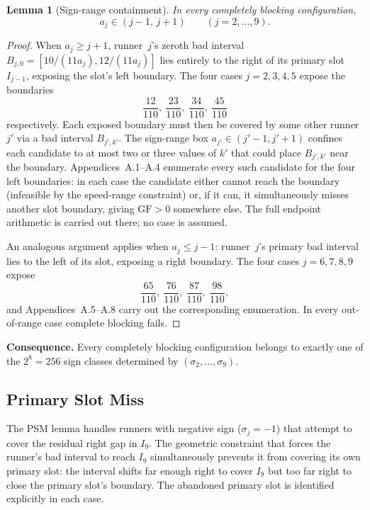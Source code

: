 \documentclass[12pt,a4paper]{amsart}
\newtheorem{lemma}[theorem]{Lemma}
\theoremstyle{definition}
\theoremstyle{remark}
\newcommand{\GF}{\mathrm{GF}}
\begin{document}
\begin{lemma}[Sign-range containment]\label{lem:sign-range}
In every completely blocking configuration,
\[
  a_j \in (j-1,\,j+1)\qquad(j=2,\ldots,9).
\]
\end{lemma}

\begin{proof}
When $a_j\ge j+1$, runner~$j$'s zeroth bad interval $B_{j,0}=[10/(11a_j),12/(11a_j)]$
lies entirely to the right of its primary slot $I_{j-1}$, exposing the slot's left
boundary. The four cases $j=2,3,4,5$ expose the boundaries
\[
  \frac{12}{110},\ \frac{23}{110},\ \frac{34}{110},\ \frac{45}{110}
\]
respectively. Each exposed boundary must then be covered by some other runner $j'$ via a
bad interval $B_{j',k'}$. The sign-range box $a_{j'}\in(j'-1,j'+1)$ confines each
candidate to at most two or three values of $k'$ that could place $B_{j',k'}$ near the
boundary. Appendices~A.1--A.4 enumerate every such candidate for the four left boundaries:
in each case the candidate either cannot reach the boundary (infeasible by the speed-range
constraint) or, if it can, it simultaneously misses another slot boundary, giving $\GF>0$
somewhere else. The full endpoint arithmetic is carried out there; no case is assumed.

An analogous argument applies when $a_j\le j-1$: runner~$j$'s primary bad interval lies
to the left of its slot, exposing a right boundary. The four cases $j=6,7,8,9$ expose
\[
  \frac{65}{110},\ \frac{76}{110},\ \frac{87}{110},\ \frac{98}{110},
\]
and Appendices~A.5--A.8 carry out the corresponding enumeration.
In every out-of-range case complete blocking fails.
\end{proof}

\noindent\textbf{Consequence.} Every completely blocking configuration belongs to exactly
one of the $2^8=256$ sign classes determined by $(\sigma_2,\ldots,\sigma_9)$.

\subsection{Primary Slot Miss}

The PSM lemma handles runners with negative sign ($\sigma_j=-1$) that attempt to cover the
residual right gap in $I_9$. The geometric constraint that forces the runner's bad interval
to reach $I_9$ simultaneously prevents it from covering its own primary slot: the interval
shifts far enough right to cover $I_9$ but too far right to close the primary slot's boundary.
The abandoned primary slot is identified explicitly in each case.
\end{document}
